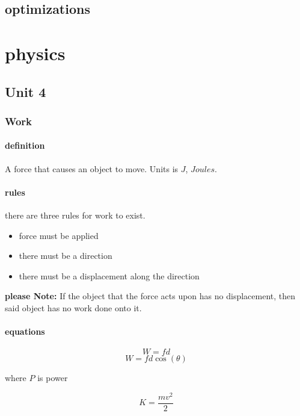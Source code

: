 \documentclass{article} %
\theoremstyle{theorem}
\theoremstyle{definition}
\begin{document}
    \subsection{optimizations}
\section{physics}
    \subsection{Unit 4}
        \subsubsection{Work}
            \paragraph{definition}
                A force that causes an object to move. Units is $J$, $Joules$.
            \paragraph{rules}
                there are three rules for work to exist.
                \begin{itemize}
                    \item force must be applied
                    \item there must be a direction
                    \item there must be a displacement along the direction
                \end{itemize}
                \textbf{please Note:} 
                If the object that the force acts upon has no displacement, then said object has no work done onto it.
            \paragraph{equations}
                \begin{equation} W=fd \end{equation}
                \begin{equation} W=fd\cos(\theta) \end{equation}
                \begin{center} where $P$ is power \end{center}
                \begin{equation}
                    K=\frac{mv^2}{2}
                \end{equation}
\end{document}
